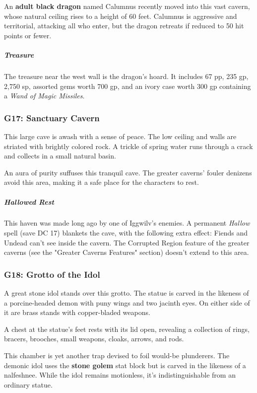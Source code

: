 \documentclass[10pt,a4paper,twoside,bg=print,twocolumn,openany,nodeprecatedcode]{dndbook}
\begin{document}
An \textbf{adult black dragon} named Calumnus recently moved into this vast cavern, whose natural ceiling rises to a height of 60 feet. Calumnus is aggressive and territorial, attacking all who enter, but the dragon retreats if reduced to 50 hit points or fewer.

\subparagraph{Treasure}
The treasure near the west wall is the dragon's hoard. It includes 67 pp, 235 gp, 2,750 sp, assorted gems worth 700 gp, and an ivory case worth 300 gp containing a \textit{Wand of Magic Missiles}.

\subsubsection{G17: Sanctuary Cavern}
\begin{DndReadAloud}{}
This large cave is awash with a sense of peace. The low ceiling and walls are striated with brightly colored rock. A trickle of spring water runs through a crack and collects in a small natural basin.

\end{DndReadAloud}

An aura of purity suffuses this tranquil cave. The greater caverns' fouler denizens avoid this area, making it a safe place for the characters to rest.

\subparagraph{Hallowed Rest}
This haven was made long ago by one of Iggwilv's enemies. A permanent \textit{Hallow} spell (save DC 17) blankets the cave, with the following extra effect: Fiends and Undead can't see inside the cavern. The Corrupted Region feature of the greater caverns (see the "Greater Caverns Features" section) doesn't extend to this area.

\subsubsection{G18: Grotto of the Idol}
\begin{DndReadAloud}{}
A great stone idol stands over this grotto. The statue is carved in the likeness of a porcine-headed demon with puny wings and two jacinth eyes. On either side of it are brass stands with copper-bladed weapons.

A chest at the statue's feet rests with its lid open, revealing a collection of rings, bracers, brooches, small weapons, cloaks, arrows, and rods.

\end{DndReadAloud}

This chamber is yet another trap devised to foil would-be plunderers. The demonic idol uses the \textbf{stone golem} stat block but is carved in the likeness of a nalfeshnee. While the idol remains motionless, it's indistinguishable from an ordinary statue.
\end{document}
